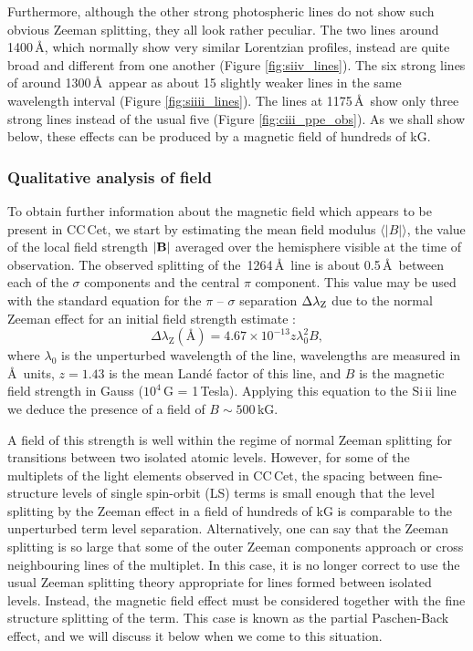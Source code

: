 \documentclass[fleqn,usenatbib]{mnras}
\newcommand{\bs}{\ensuremath{\langle \vert B \vert \rangle}}
\begin{document}
Furthermore, although the other strong photospheric lines do not show such obvious Zeeman splitting, they all look rather peculiar. The two  lines around 1400\,\AA, which normally show very similar Lorentzian profiles, instead are quite broad and different from one another (Figure \ref{fig:siiv_lines}). The six strong lines of  around 1300\,\AA\ appear as about 15 slightly weaker lines in the same wavelength interval (Figure \ref{fig:siiii_lines}). The  lines at 1175\,\AA\ show only three strong lines instead of the usual five (Figure \ref{fig:ciii_ppe_obs}). As we shall show below, these effects can be produced by a magnetic field of hundreds of kG.




\subsubsection{Qualitative analysis of field}

To obtain further information about the magnetic field which appears to be present in CC\,Cet, we start by estimating the mean field modulus \bs, the value of the local field strength $|{\bf B}|$ averaged over the hemisphere visible at the time of observation. The observed splitting of the  \,1264\,\AA\  line is about 0.5\,\AA\ between each of the $\sigma$ components and the central $\pi$ component. This value  may be used with the standard equation for the $\pi$ -- $\sigma$ separation $\Delta \lambda_{\rm Z}$ due to the normal Zeeman effect for an initial field strength estimate \citep[e.g.][]{Land92}:
\begin{equation}
    \label{zeeman-splitting.eqn}
\Delta \lambda_{\mathrm{Z}}(\mbox{\AA}) = 4.67\times10^{-13} z \lambda_0^2 B,
\end{equation}
where $\lambda_0$ is the unperturbed wavelength of the line, wavelengths are measured in \AA\ units, $z = 1.43$ is the mean Land{\'e} factor of this line, and $B$ is the magnetic field strength in Gauss ($10^4$\,G = 1\,Tesla). Applying this equation to the Si\,{\sc ii} line we deduce the presence of a field of $B \sim 500$\,kG.

A field of this strength is well within the regime of normal Zeeman splitting for transitions between two isolated atomic levels. However, for some of the multiplets of the light elements observed in CC\,Cet, the spacing between fine-structure levels of single spin-orbit (LS) terms is small enough that the level splitting by the Zeeman effect in a field of hundreds of kG is comparable to the unperturbed term level separation. Alternatively, one can say that the Zeeman splitting is so large that some of the outer Zeeman components approach or cross neighbouring lines of the multiplet. In this case, it is no longer correct to use the usual Zeeman splitting theory appropriate for lines formed between isolated levels. Instead, the magnetic field effect must be considered together with the fine structure splitting of the term. This case is known as the partial Paschen-Back effect, and we will discuss it below when we come to this situation.
\end{document}
